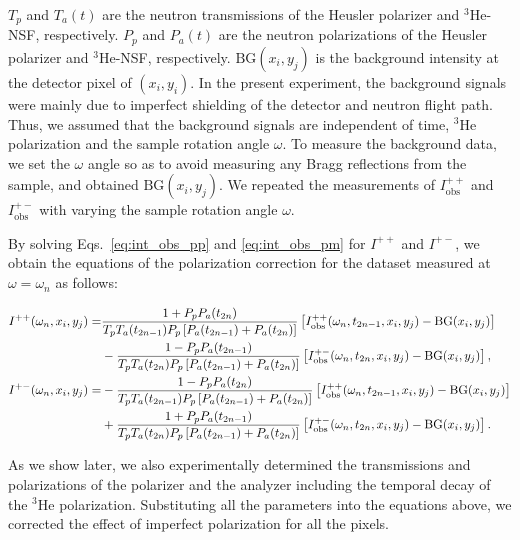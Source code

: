 \documentclass[%
 reprint,
superscriptaddress,
 amsmath,amssymb,
 aps,
floatfix,
]{revtex4-2}
\newcommand{\He}{$^3$He }
\newcommand{\Hensf}{$^3$He-NSF}
\begin{document}
$T_p$ and $T_a(t)$ are the neutron transmissions of the Heusler polarizer and \Hensf, respectively.
$P_p$ and $P_a(t)$ are the neutron polarizations of the Heusler polarizer and \Hensf, respectively.
$\mathrm{BG}(x_i,y_j)$ is the background intensity at the detector pixel of $(x_i, y_i)$.
In the present experiment, the background signals were mainly due to imperfect shielding of the detector and neutron flight path. 
Thus, we assumed that the background signals are independent of time, \He polarization and the sample rotation angle $\omega$. %
To measure the background data, we set the $\omega$ angle so as to avoid measuring any Bragg reflections from the sample, and obtained $\mathrm{BG}(x_i,y_j)$. 
We repeated the measurements of $I^{++}_\mathrm{obs}$ and $I^{+-}_\mathrm{obs}$ with varying the sample rotation angle $\omega$.

By solving Eqs.~\ref{eq:int_obs_pp} and \ref{eq:int_obs_pm} for $I^{++}$ and $I^{+-}$, we obtain the equations of the polarization correction for the dataset measured at $\omega=\omega_n$ as follows:
\begin{widetext}
    \begin{align}
        I^{++}(\omega_n,x_i,y_j) =&
        \frac{1+P_pP_a(t_{2n})}
        {T_pT_a(t_{2n-1})P_p\left[P_a(t_{2n-1})+P_a(t_{2n})\right]}
        \left[I^{++}_\mathrm{obs}(\omega_n,t_{2n-1},x_i,y_j)-\mathrm{BG}(x_i,y_j)\right]
        \notag\\
        &-
        \frac{1-P_pP_a(t_{2n-1})}
        {T_pT_a(t_{2n})P_p\left[P_a(t_{2n-1})+P_a(t_{2n})\right]}
        \left[I^{+-}_\mathrm{obs}(\omega_n,t_{2n},x_i,y_j)-\mathrm{BG}(x_i,y_j)\right],
        \\
        I^{+-}(\omega_n,x_i,y_j) =&
        -
        \frac{1-P_pP_a(t_{2n})}
        {T_pT_a(t_{2n-1})P_p\left[P_a(t_{2n-1})+P_a(t_{2n})\right]}
        \left[I^{++}_\mathrm{obs}(\omega_n,t_{2n-1},x_i,y_j)-\mathrm{BG}(x_i,y_j)\right]
        \notag\\
        &+
        \frac{1+P_pP_a(t_{2n-1})}
        {T_pT_a(t_{2n})P_p\left[P_a(t_{2n-1})+P_a(t_{2n})\right]}
        \left[I^{+-}_\mathrm{obs}(\omega_n,t_{2n},x_i,y_j)-\mathrm{BG}(x_i,y_j)\right].
        \label{eq:int_corr}
    \end{align}
\end{widetext}
As we show later, we also experimentally determined the transmissions and polarizations of the polarizer and the analyzer including the temporal decay of the \He polarization.  %
Substituting all the parameters into the equations above, we corrected the effect of imperfect polarization for all the pixels.
\end{document}
